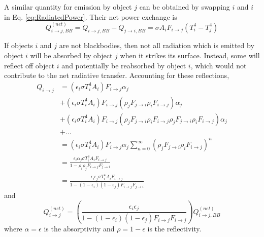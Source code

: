 A similar quantity for emission by object $j$ can be obtained by swapping $i$ and $i$ in Eq. \ref{eq:RadiatedPower}. Their net power exchange is
%
\begin{equation} \label{eq:RadiatedPower}
Q_{i \rightarrow j, BB}^{(net)} = Q_{i \rightarrow j, BB} - Q_{j \rightarrow i, BB} = \sigma A_{i} F_{i \rightarrow j} \left( T_{i}^{4} - T_{j}^{4} \right)
\end{equation}

If objects $i$ and $j$ are not blackbodies, then not all radiation which is emitted by object $i$ will be absorbed by object $j$ when it strikes its surface. Instead, some will reflect off object $i$ and potentially be reabsorbed by object $i$, which would not contribute to the net radiative transfer. Accounting for these reflections,
%
\begin{align*}
    Q_{i \rightarrow j} &= \left( \epsilon_{i} \sigma T_{i}^{4} A_{i} \right) F_{i \rightarrow j} \alpha_{j} \\
    &+ \left( \epsilon_{i} \sigma T_{i}^{4} A_{i} \right) F_{i \rightarrow j} \left( \rho_{j} F_{j \rightarrow i} \rho_{i} F_{i \rightarrow j} \right) \alpha_{j} \\
    &+ \left( \epsilon_{i} \sigma T_{i}^{4} A_{i} \right) F_{i \rightarrow j} \left( \rho_{j} F_{j \rightarrow i} \rho_{i} F_{i \rightarrow j} \rho_{j} F_{j \rightarrow i} \rho_{i} F_{i \rightarrow j} \right) \alpha_{j} \\
    &+ ... \\
    &= \left( \epsilon_{i} \sigma T_{i}^{4} A_{i} \right) F_{i \rightarrow j} \alpha_{j} \sum_{n=0}^{\infty} \left( \rho_{j} F_{j \rightarrow i} \rho_{i} F_{i \rightarrow j}\right)^{n} \\
    &= \frac{\epsilon_{i} \alpha_{j} \sigma T_{i}^{4} A_{i} F_{i \rightarrow j}}{1- \rho_{i} \rho_{j} F_{i \rightarrow j} F_{j \rightarrow i} } \\
    &= \frac{\epsilon_{i} \epsilon_{j} \sigma T_{i}^{4} A_{i} F_{i \rightarrow j}}{1- (1-\epsilon_{i}) (1-\epsilon_{j}) F_{i \rightarrow j} F_{j \rightarrow i} }
\end{align*}
%
and
%
\begin{equation}
    Q_{i \rightarrow j}^{(net)} = \left( \frac{\epsilon_{i} \epsilon_{j} }{1- (1-\epsilon_{i}) (1-\epsilon_{j}) F_{i \rightarrow j} F_{i \rightarrow j} } \right) Q_{i \rightarrow j, BB}^{(net)}
\end{equation}
%
where $\alpha = \epsilon$ is the absorptivity and $\rho = 1 - \epsilon$ is the reflectivity. 
